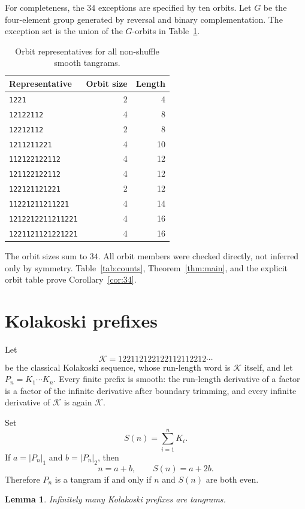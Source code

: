 \documentclass[11pt]{article}
\newtheorem{lemma}[theorem]{Lemma}
\theoremstyle{definition}
\theoremstyle{remark}
\newcommand{\K}{\mathcal K}
\begin{document}
For completeness, the $34$ exceptions are specified by ten orbits.
Let $G$ be the four-element group generated by reversal and binary
complementation.  The exception set is the union of the $G$-orbits in
Table~\ref{tab:exceptions}.

\begin{table}[ht]
\centering
\small
\caption{Orbit representatives for all non-shuffle smooth tangrams.}
\label{tab:exceptions}
\begin{tabular}{lrr}
\toprule
Representative & Orbit size & Length\\
\midrule
\texttt{1221} &2&4\\
\texttt{12122112} &4&8\\
\texttt{12212112} &2&8\\
\texttt{1211211221} &4&10\\
\texttt{112122122112} &4&12\\
\texttt{121122122112} &4&12\\
\texttt{122121121221} &2&12\\
\texttt{11221211211221} &4&14\\
\texttt{1212212211211221} &4&16\\
\texttt{1221121121221221} &4&16\\
\bottomrule
\end{tabular}
\end{table}

The orbit sizes sum to $34$.  All orbit members were checked directly,
not inferred only by symmetry.  Table~\ref{tab:counts},
Theorem~\ref{thm:main}, and the explicit orbit table prove
Corollary~\ref{cor:34}.

\section{Kolakoski prefixes}

Let
\[
 \K=122112122122112112212\cdots
\]
be the classical Kolakoski sequence, whose run-length word is $\K$
itself, and let $P_n=K_1\cdots K_n$.  Every finite prefix is smooth:
the run-length derivative of a factor is a factor of the infinite
derivative after boundary trimming, and every infinite derivative of
$\K$ is again $\K$.

Set
\[
 S(n)=\sum_{i=1}^nK_i.
\]
If $a=|P_n|_1$ and $b=|P_n|_2$, then
\[
 n=a+b,\qquad S(n)=a+2b.
\]
Therefore $P_n$ is a tangram if and only if $n$ and $S(n)$ are both
even.

\begin{lemma}\label{lem:infinite-parity}
Infinitely many Kolakoski prefixes are tangrams.
\end{lemma}
\end{document}
